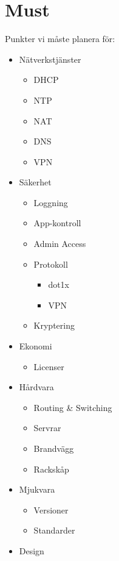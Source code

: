 \section*{Must}
Punkter vi måste planera för:

\begin{itemize}[noitemsep]
    \item Nätverkstjänster
    \begin{itemize}[noitemsep]
        \item DHCP
        \item NTP
        \item NAT
        \item DNS
        \item VPN
    \end{itemize}
    \item Säkerhet
    \begin{itemize}[noitemsep]
        \item Loggning
        \item App-kontroll
        \item Admin Access
        \item Protokoll
        \begin{itemize}[noitemsep]
            \item dot1x
            \item VPN
        \end{itemize}
        \item Kryptering
    \end{itemize}
    \item Ekonomi
    \begin{itemize}[noitemsep]
        \item Licenser
    \end{itemize}
    \item Hårdvara
    \begin{itemize}[noitemsep]
        \item Routing \& Switching
        \item Servrar
        \item Brandvägg
        \item Rackskåp
    \end{itemize}
    \item Mjukvara
    \begin{itemize}[noitemsep]
        \item Versioner
        \item Standarder
    \end{itemize}
    \item Design

\end{itemize}

